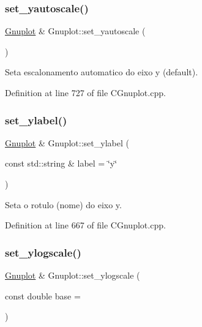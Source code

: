 \subsubsection{\texorpdfstring{set\+\_\+yautoscale()}{set\_yautoscale()}}
{\footnotesize\ttfamily \hyperlink{class_gnuplot}{Gnuplot} \& Gnuplot\+::set\+\_\+yautoscale (\begin{DoxyParamCaption}{ }\end{DoxyParamCaption})}



Seta escalonamento automatico do eixo y (default). 



Definition at line 727 of file C\+Gnuplot.\+cpp.

\mbox{\label{class_gnuplot_a7654b86e3873aec4c5101abb466fe4ab}} 
\subsubsection{\texorpdfstring{set\+\_\+ylabel()}{set\_ylabel()}}
{\footnotesize\ttfamily \hyperlink{class_gnuplot}{Gnuplot} \& Gnuplot\+::set\+\_\+ylabel (\begin{DoxyParamCaption}\item[{const std\+::string \&}]{label = {\ttfamily \char`\"{}y\char`\"{}} }\end{DoxyParamCaption})}



Seta o rotulo (nome) do eixo y. 



Definition at line 667 of file C\+Gnuplot.\+cpp.

\mbox{\label{class_gnuplot_a201a802d2f27fece0d39809c4eb3bce0}} 
\subsubsection{\texorpdfstring{set\+\_\+ylogscale()}{set\_ylogscale()}}
{\footnotesize\ttfamily \hyperlink{class_gnuplot}{Gnuplot} \& Gnuplot\+::set\+\_\+ylogscale (\begin{DoxyParamCaption}\item[{const double}]{base = {} }\end{DoxyParamCaption})}



